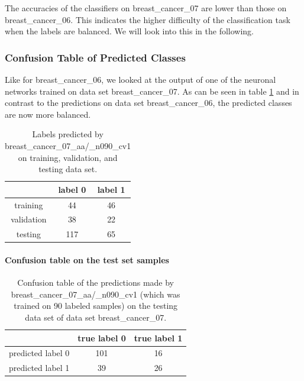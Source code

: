 The accuracies of the classifiers on breast\_cancer\_07 are lower
than those on breast\_cancer\_06. This indicates the higher difficulty
of the classification task when the labels are balanced. We will look
into this in the following.

\subsubsection{Confusion Table of Predicted Classes}

Like for breast\_cancer\_06, we looked at the output of one of the
neuronal networks trained on data set breast\_cancer\_07. As can be
seen in table \ref{tab:predictions-of-breast_cancer_07_aa} and in
contrast to the predictions on data set breast\_cancer\_06, the predicted
classes are now more balanced.

\begin{table}
\begin{centering}
\begin{tabular}{|c|c|c|}
\hline 
 & label 0 & label 1\tabularnewline
\hline 
\hline 
training & 44 & 46\tabularnewline
\hline 
validation & 38 & 22\tabularnewline
\hline 
testing & 117 & 65\tabularnewline
\hline 
\end{tabular}
\par\end{centering}
\caption{\label{tab:predictions-of-breast_cancer_07_aa}Labels predicted by
breast\_cancer\_07\_aa/\_n090\_cv1
on training, validation, and testing data set.}
\end{table}

\paragraph{Confusion table on the test set samples}

\begin{table}
\begin{centering}
\begin{tabular}{|c||c|c|}
\hline 
 & true label 0 & true label 1\tabularnewline
\hline 
\hline 
predicted label 0 & 101 & 16\tabularnewline
\hline 
predicted label 1 & 39 & 26\tabularnewline
\hline 
\end{tabular}
\par\end{centering}
\caption[Confusion table of the predictions made by breast\_cancer\_07\_aa/\_n090.]{\label{tab:Confusion-table-of-breast_cancer_07_aa/_n090_cv1}Confusion
table of the predictions made by breast\_cancer\_07\_aa/\_n090\_cv1
(which was trained on 90 labeled samples) on the testing data set
of data set breast\_cancer\_07.}
\end{table}

